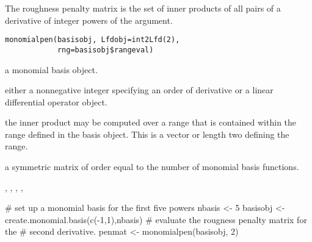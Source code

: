 \begin{Description}\relax
The roughness penalty matrix is the set of
inner products of all pairs of a derivative of integer powers of the
argument.
\end{Description}
\begin{Usage}
\begin{verbatim}
monomialpen(basisobj, Lfdobj=int2Lfd(2),
            rng=basisobj$rangeval)
\end{verbatim}
\end{Usage}
\begin{Arguments}
\begin{ldescription}
\item[\code{basisobj}] a monomial basis object.

\item[\code{Lfdobj}] either a nonnegative integer specifying an order of derivative
or a linear differential operator object.

\item[\code{rng}] the inner product may be computed over a range that is contained
within the range defined in the basis object.  This is a vector
or length two defining the range.

\end{ldescription}
\end{Arguments}
\begin{Value}
a symmetric matrix of order equal to the number of
monomial basis functions.
\end{Value}
\begin{SeeAlso}\relax
{}, 
, 
, 
, 
\end{SeeAlso}
\begin{Examples}
\begin{ExampleCode}

# set up a monomial basis for the first five powers
nbasis   <- 5
basisobj <- create.monomial.basis(c(-1,1),nbasis)
#  evaluate the rougness penalty matrix for the
#  second derivative.
penmat <- monomialpen(basisobj, 2)

\end{ExampleCode}
\end{Examples}

